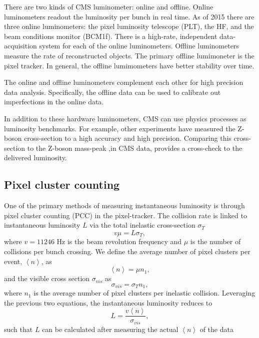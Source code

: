 There are two kinds of CMS luminometer: online and offline. Online luminometers readout the luminosity per bunch in real time. As of 2015 there are three online luminometers: the pixel luminosity telescope (PLT), the HF, and the beam conditions monitor (BCM1f). There is a high-rate, independent data-acquisition system for each of the online luminometers. Offline luminometers measure the rate of reconstructed objects. The primary offline lumimoneter is the pixel tracker. In general, the offline lumimometers have better stability over time. \cite{CMS:2010gua}

The online and offline luminometers complement each other for high precision data analysis. Specifically, the offline data can be used to calibrate out imperfections in the online data. 

In addition to these hardware luminometers, CMS can use physics processes as luminosity benchmarks.  For example, other experiments have measured the Z-boson cross-section to a high accuracy and high precision. Comparing this cross-section to the Z-boson mass-peak ,in CMS data, provides a cross-check to the delivered luminosity. 

\subsection{Pixel cluster counting}

One of the primary methods of measuring instantaneous luminosity is through pixel cluster counting (PCC) in the pixel-tracker. The collision rate is linked to instantaneous luminosity $L$ via the total inelastic cross-section $\sigma_T$
\begin{equation}
v \mu  = L \sigma_T,
\end{equation}
where $v=11246$ Hz is the beam revolution frequency and $\mu$ is the number of collisions per bunch crossing. We define the average number of pixel clusters per event, $\left \langle n \right \rangle$, as
\begin{equation}
\left \langle n \right \rangle = \mu n_1,
\end{equation}
and the visible cross section $\sigma_{vis}$ as 
\begin{equation}
\sigma_{vis} = \sigma_T n_1,
\end{equation}
where $n_1$ is the average number of pixel clusters per inelastic collision. Leveraging the previous two equations, the instantaneous luminosity reduces to
\begin{equation}
L = \frac{v\left \langle n \right \rangle}{\sigma_{vis}},
\end{equation}
such that $L$ can be calculated after measuring the actual $\left \langle n \right \rangle$ of the data \cite{CMS:2013gfa}

